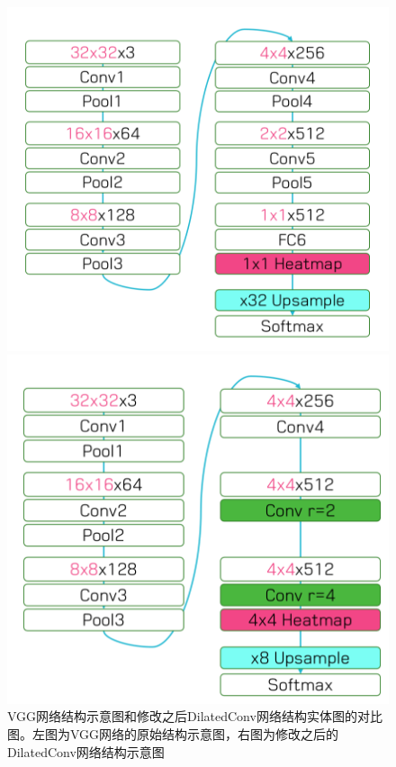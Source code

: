 \documentclass[cn]{elegantbook}
\begin{document}
\begin{figure}[!h]
	\centering
	\begin{minipage}[t]{0.45\textwidth}
		\centering
		\includegraphics[width=\textwidth]{images/vgg16}
	\end{minipage}
	\begin{minipage}[t]{0.45\textwidth}
		\centering
		\includegraphics[width=\textwidth]{images/vgg16dial}
	\end{minipage}
	\caption{\label{deeplabNet}VGG网络结构示意图和修改之后DilatedConv网络结构实体图的对比图。左图为VGG网络的原始结构示意图，右图为修改之后的DilatedConv网络结构示意图}
\end{figure}
\end{document}
